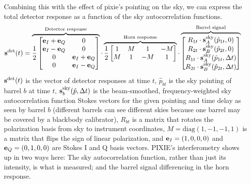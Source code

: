 \documentclass{article}
\renewcommand{\vec}[1]{{\bf #1}}
\begin{document}
Combining this with the effect of pixie's pointing on the sky,
we can express the total detector response as a function of the
sky autocorrelation functions.
\begin{align}
\vec s^\textrm{det}(t) &= \overbrace{\frac12\begin{bmatrix}
	\vec e_I+\vec e_Q & 0 \\
	\vec e_I-\vec e_Q & 0 \\
	0 & \vec e_I+\vec e_Q  \\
	0 & \vec e_I-\vec e_Q \end{bmatrix}}^\textrm{Detector response}
	\cdot
	\overbrace{\frac12\begin{bmatrix}
	1 &  M &  1 & -M \\
	M &  1 & -M &  1
	\end{bmatrix}}^\textrm{Horn response}
	\cdot
	\overbrace{\begin{bmatrix}
	R_{1t}\cdot\vec s^\textrm{sky}_A(\hat p_{1t},0) \\
	R_{2t}\cdot\vec s^\textrm{sky}_B(\hat p_{2t},0) \\
	R_{1t}\cdot\vec s^\textrm{sky}_A(\hat p_{1t},\Delta t) \\
	R_{2t}\cdot\vec s^\textrm{sky}_B(\hat p_{2t},\Delta t)
	\end{bmatrix}}^\textrm{Barrel signal}
	\label{eq:response}
\end{align}
$\vec s^\textrm{det}(t)$ is the vector of
detector responses at time $t$,
$\hat p_{bt}$ is the sky pointing of barrel $b$ at time $t$,
$\vec s^\textrm{sky}_b(\hat p,\Delta t)$ is the beam-smoothed,
frequency-weighted sky autocorrelation
function Stokes vectors for the given pointing and time delay as
seen by barrel $b$
(different barrels can see different skies because one barrel may
be covered by a blackbody calibrator),
$R_{bt}$ is
a matrix that rotates the polarization basis from sky to instrument
coordinates, $M = \textrm{diag}(1,-1,-1,1)$ is a matrix that flips
the sign of linear polarization,
and $\vec e_I = (1,0,0,0)$ and $\vec e_Q = (0,1,0,0)$ are Stokes
I and Q basis vectors. PIXIE's interferometry shows up in two ways here:
The sky autocorrelation function, rather than just its intensity,
is what is measured; and the barrel signal differencing in the horn
response.
\end{document}
